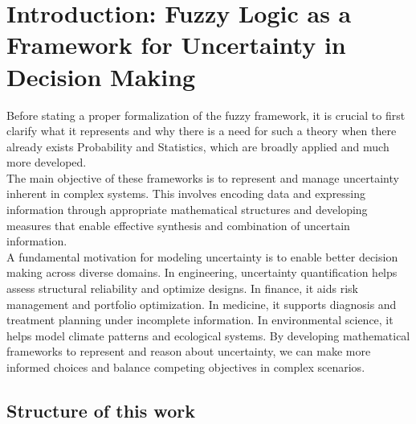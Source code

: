 \setcounter{chapter}{-1}
\chapter{Introduction: Fuzzy Logic as a Framework for Uncertainty in Decision Making}


Before stating a proper formalization of the fuzzy framework, it is crucial to first clarify what it represents and why there is a need for such a theory when there already exists Probability and Statistics, which are broadly applied and much more developed.\\

The main objective of these frameworks is to represent and manage uncertainty inherent in complex systems. This involves encoding data and expressing information through appropriate mathematical structures and developing measures that enable effective synthesis and combination of uncertain information.\\

A fundamental motivation for modeling uncertainty is to enable better decision making across diverse domains. In engineering, uncertainty quantification helps assess structural reliability and optimize designs. In finance, it aids risk management and portfolio optimization. In medicine, it supports diagnosis and treatment planning under incomplete information. In environmental science, it helps model climate patterns and ecological systems. By developing mathematical frameworks to represent and reason about uncertainty, we can make more informed choices and balance competing objectives in complex scenarios.\\



 



\section{Structure of this work}





